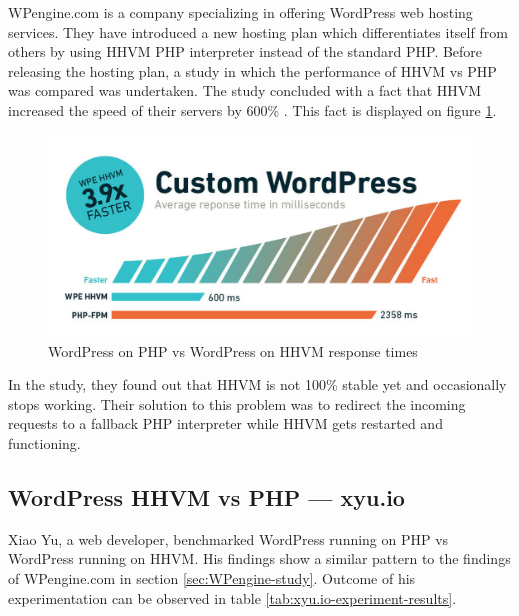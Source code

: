 WPengine.com is a company specializing in offering WordPress web hosting services. They have introduced a new hosting plan which differentiates itself from others by using HHVM PHP interpreter instead of the standard PHP. Before releasing the hosting plan, a study in which the performance of HHVM vs PHP was compared was undertaken. The study concluded with a fact that HHVM increased the speed of their servers by 600\% \cite{Study:Perf-WPEngine}. This fact is displayed on figure \ref{fig:wpengine-hhvm-php-wordpress}.

\begin{figure}[H]
\begin{center}
\includegraphics[scale=0.5]{figures/wpengine-hhvm-php-wordpress.png}
\caption{WordPress on PHP vs WordPress on HHVM response times}
\label{fig:wpengine-hhvm-php-wordpress}
\end{center}
\end{figure}

In the study, they found out that HHVM is not 100\% stable yet and occasionally stops working. Their solution to this problem was to redirect the incoming requests to a fallback PHP interpreter while HHVM gets restarted and functioning. 

\subsection{WordPress HHVM vs PHP — xyu.io}

Xiao Yu, a web developer, benchmarked \cite{Study:Perf-XYU.io} WordPress running on PHP vs WordPress running on HHVM. His findings show a similar pattern to the findings of WPengine.com in section \ref{sec:WPengine-study}. Outcome of his experimentation can be observed in table \ref{tab:xyu.io-experiment-results}. 

